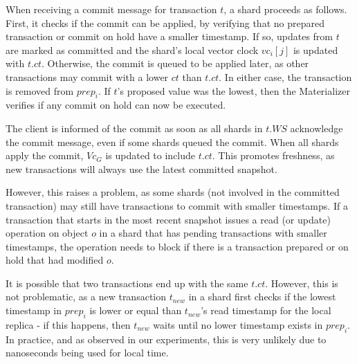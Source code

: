 \documentclass[sigplan,twocolumn,review,anonymous]{acmart}
\begin{document}
When receiving a commit message for transaction $t$, a shard proceeds as follows.
First, it checks if the commit can be applied, by verifying that no prepared transaction or commit on hold have a 
smaller timestamp.
If so, updates from $t$ are marked as committed and the shard's local vector clock $\mathit{vc}_i[j]$ is 
updated with $t\!.\mathit{ct}$. 
Otherwise, the commit is queued to be applied later, as other transactions may commit with a lower
$\mathit{ct}$ than $t\!.\mathit{ct}$.
In either case,  the transaction is removed from $\mathit{prep}_i$. If $t$'s proposed value was the lowest, 
then the Materializer verifies if any commit on hold can now be executed.

The client is informed of the commit as soon as all shards in $t.WS$ acknowledge the commit message, even if 
some shards queued the commit.
When all shards apply the commit, $\mathit{Vc}_G$ is updated to include $t\!.\mathit{ct}$.
This promotes freshness, as new transactions will always use the latest committed snapshot.

However, this raises a problem, as some shards (not involved in the committed transaction) 
may still have transactions to commit with smaller timestamps. 
If a transaction that starts in the most recent snapshot issues a read (or update) operation on object $o$ in a shard that has
pending transactions with smaller timestamps, the operation needs to block if there is a transaction prepared or on hold 
that had modified $o$. 

It is possible that two transactions end up with the same $t\!.\mathit{ct}$.
However, this is not problematic, as a new transaction $\mathit{t}_\mathit{new}$  in a shard first checks if the lowest timestamp in $\mathit{prep}_i$ is lower or equal than $\mathit{t}_\mathit{new}$'s read timestamp for the local replica - if this happens, then $\mathit{t}_\mathit{new}$ waits until no lower timestamp exists in $\mathit{prep}_i$.
In practice, and as observed in our experiments, this is very unlikely due to  nanoseconds being used for local time. %
\end{document}
